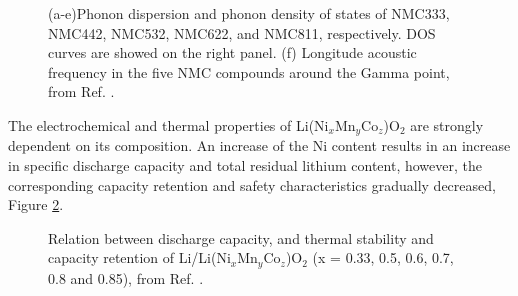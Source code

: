 \documentclass[aps,prb,twocolumn,superscriptaddress,reprint]{revtex4-1}
\begin{document}
\begin{figure}[h]
  \centering
    \caption{(a-e)Phonon dispersion and phonon density of states of NMC333, NMC442, NMC532, NMC622, and NMC811, respectively. DOS curves are showed on the right panel. (f) Longitude acoustic frequency in the five NMC compounds around the Gamma point, from Ref. .}
  \label{figure_phonon}
\end{figure}

The electrochemical and thermal properties of Li(Ni$_x$Mn$_y$Co$_z$)O$_2$ are strongly dependent on its composition. An increase of the Ni content results in an increase in speciﬁc discharge capacity and total residual lithium content, however, the corresponding capacity retention and safety characteristics gradually decreased, Figure \ref{figure_thermal}. \cite{noh2013comparison} 

\begin{figure}[h]
  \centering
    \caption{Relation between discharge capacity, and thermal stability and capacity retention of Li/Li(Ni$_x$Mn$_y$Co$_z$)O$_2$ (x = 0.33, 0.5, 0.6, 0.7, 0.8 and 0.85), from Ref. .}
  \label{figure_thermal}
\end{figure}
\end{document}

